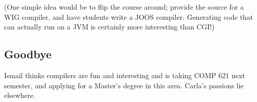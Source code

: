 \documentclass{WigReport}
\begin{document}
(One simple idea would be to flip the course around; provide the source for
a WIG compiler, and have students write a JOOS compiler. Generating code
that can actually run on a JVM is certainly more interesting than CGI!)

\subsection{Goodbye}
Ismail thinks compilers are fun and interesting and is taking COMP 621 
next semester, and applying for a Master's degree in this area. Carla's 
passions lie elsewhere.
\end{document}
